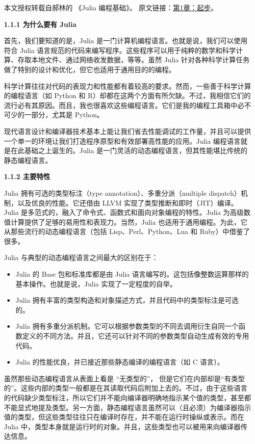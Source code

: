 
本文授权转载自郝林的 《Julia 编程基础》。 原文链接：\href{https://github.com/hyper0x/JuliaBasics/blob/master/book/ch01.md}{第1章：起步}。

\textbf{1.1.1 为什么要有 Julia}

首先，我们要知道的是，Julia 是一门计算机编程语言。也就是说，我们可以使用符合 Julia 语言规范的代码来编写程序。这些程序可以用于纯粹的数学和科学计算、存取本地文件、通过网络收发数据，等等。虽然 Julia 针对各种科学计算任务做了特别的设计和优化，但它也适用于通用目的的编程。

科学计算往往对代码的表现力和性能都有着较高的要求。然而，一些善于科学计算的编程语言（如 Python 和 R）却都在这两个方面有所欠缺。不过，我相信它们的流行必有其原因。而且，我也很喜欢这些编程语言。它们是我的编程工具箱中必不可少的一部分，尤其是 Python。

现代语言设计和编译器技术基本上能让我们省去性能调试的工作量，并且可以提供一个单一的环境让我们打造程序原型和有效部署高性能的应用。Julia 编程语言就是在此基础之上诞生的。Julia 是一门灵活的动态编程语言，但其性能堪比传统的静态编程语言。

\textbf{1.1.2 主要特性}

Julia 拥有可选的类型标注（type annotation）、多重分派（multiple dispatch）机制，以及优良的性能。它还借由 LLVM 实现了类型推断和即时（JIT）编译。Julia 是多范式的，融入了命令式、函数式和面向对象编程的特性。Julia 为高级数值计算提供了足够的易用性和表现力。当然，Julia 也适用于通用编程。为此，它从那些流行的动态编程语言（包括 Lisp、Perl、Python、Lua 和 Ruby）中借鉴了很多。

Julia 与典型的动态编程语言之间最大的区别在于：

\begin{itemize}
\item Julia 的 Base 包和标准库都是由 Julia 语言编写的。这包括像整数运算那样的基本操作。也就是说，Julia 实现了一定程度的自举。
\item Julia 拥有丰富的类型构造和对象描述方式，并且代码中的类型标注是可选的。
\item Julia 拥有多重分派机制。它可以根据参数类型的不同去调用衍生自同一个函数定义的不同方法。并且，它还可以针对不同的参数类型自动生成有效的专用代码。
\item Julia 的性能优良，并已接近那些静态编译的编程语言（如 C 语言）。
\end{itemize}

虽然那些动态编程语言从表面上看是 “无类型的”， 但是它们在内部却是“有类型的”。这些内部的类型一般都是在其读取代码后附加上去的。不过，由于这些语言的代码缺少类型标注，所以它们并不能向编译器明确地指示某个值的类型，甚至都不能显式地提及类型。另一方面，静态编程语言虽然可以（且必须）为编译器指示值的类型，但这些类型往往只在编译时存在，并不能在运行时操纵或表示。而在 Julia 中，类型本身就是运行时的对象。并且，这些类型也可以被用来向编译器传达信息。

